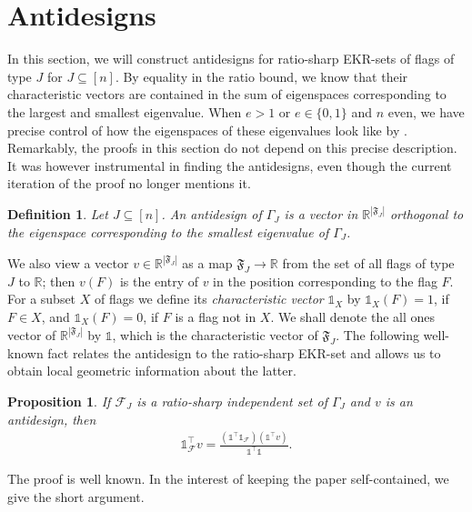 \documentclass[11pt]{article}
\newtheorem{prop}[thm]{Proposition}
\newtheorem{de}[thm]{Definition}
\newcommand{\allones}{\mathds{1}}
\newcommand{\charvec}{\mathds{1}}
\newcommand{\EKR}{\mathcal{F}}
\newcommand{\cF}{\mathfrak{F}}
\begin{document}
\section{Antidesigns}\label{sec:antidesigns}

In this section, we will construct antidesigns for ratio-sharp EKR-sets of flags of type $J$ for $J \subseteq [n]$. By equality in the ratio bound, we know that their characteristic vectors are contained in the sum of eigenspaces corresponding to the largest and smallest eigenvalue. When $e > 1$ or $e \in \{0,1\}$ and $n$ even, we have precise control of how the eigenspaces of these eigenvalues look like by \cite{AlgebraicApproach2}. Remarkably, the proofs in this section do not depend on this precise description. It was however instrumental in finding the antidesigns, even though the current iteration of the proof no longer mentions it.

\begin{de}\label{def:antidesign}
Let $J \subseteq [n]$. An \emph{antidesign} of $\Gamma_J$ is a vector in $\mathbb{R}^{|\cF_J|}$ orthogonal to the eigenspace corresponding to the smallest eigenvalue of $\Gamma_J$.
\end{de}


We also view a vector $v \in \mathbb{R}^{|\cF_J|}$ as a map $\cF_J \to \mathbb{R}$ from the set of all flags of type $J$ to $\mathbb{R}$; then $v(F)$ is the entry of $v$ in the position corresponding to the flag $F$. For a subset $X$ of flags we define its \emph{characteristic vector} $\charvec_X$ by $\charvec_X(F)=1$, if $F\in X$, and $\charvec_X(F)=0$, if $F$ is a flag not in $X$. We shall denote the all ones vector of $\mathbb{R}^{|\cF_J|}$ by $\allones$, which is the characteristic vector of  $\cF_J$. The following well-known fact relates the antidesign to the ratio-sharp EKR-set and allows us to obtain local geometric information about the latter.

\begin{prop}\label{P: intersection_F_with_antidesing}
If $\EKR_J$ is a ratio-sharp independent set of $\Gamma_J$ and $v$ is an antidesign, then
\begin{align*}
\charvec_\EKR^\top v=\frac{(\allones^\top \allones_\EKR)(\allones^\top v)}{\allones^\top \allones}.
\end{align*}
\end{prop}

The proof is well known. In the interest of keeping the paper self-contained, we give the short argument.
\end{document}
